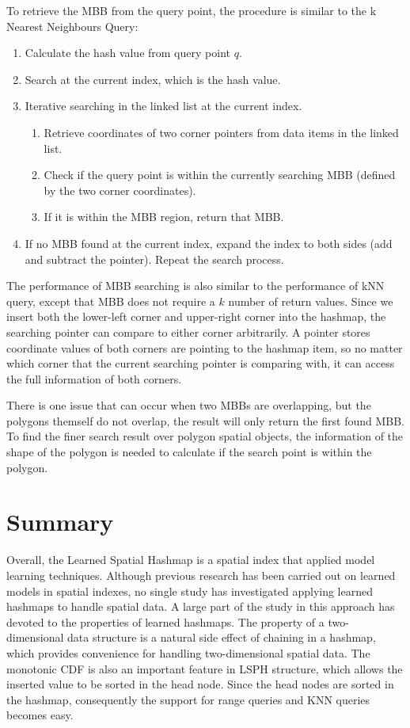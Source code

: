 To retrieve the MBB from the query point, the procedure is similar to the k Nearest Neighbours Query: 
\begin{enumerate}
    \item Calculate the hash value from query point $q$.
    \item Search at the current index, which is the hash value.
    \item Iterative searching in the linked list at the current index. 
    \begin{enumerate}
        \item Retrieve coordinates of two corner pointers from data items in the linked list. 
        \item Check if the query point is within the currently searching MBB (defined by the two corner coordinates).
        \item If it is within the MBB region, return that MBB.  
    \end{enumerate}
    \item If no MBB found at the current index, expand the index to both sides (add and subtract the pointer). Repeat the search process.
\end{enumerate}

The performance of MBB searching is also similar to the performance of kNN query, except that MBB does not require a $k$ number of return values. Since we insert both the lower-left corner and upper-right corner into the hashmap, the searching pointer can compare to either corner arbitrarily. A pointer stores coordinate values of both corners are pointing to the hashmap item, so no matter which corner that the current searching pointer is comparing with, it can access the full information of both corners. 

There is one issue that can occur when two MBBs are overlapping, but the polygons themself do not overlap, the result will only return the first found MBB. To find the finer search result over polygon spatial objects, the information of the shape of the polygon is needed to calculate if the search point is within the polygon. 

\section{Summary}
Overall, the Learned Spatial Hashmap is a spatial index that applied model learning techniques. Although previous research has been carried out on learned models in spatial indexes, no single study has investigated applying learned hashmaps to handle spatial data. A large part of the study in this approach has devoted to the properties of learned hashmaps.  The property of a two-dimensional data structure is a natural side effect of chaining in a hashmap, which provides convenience for handling two-dimensional spatial data. The monotonic CDF is also an important feature in LSPH structure, which allows the inserted value to be sorted in the head node. Since the head nodes are sorted in the hashmap, consequently the support for range queries and KNN queries becomes easy. 


